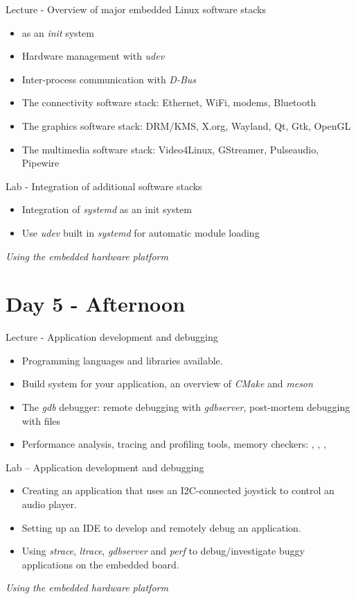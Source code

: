 \documentclass[a4paper,12pt,obeyspaces,spaces,hyphens]{article}
\begin{document}
\feagendatwocolumn
{Lecture - Overview of major embedded Linux software stacks}
{
  \begin{itemize}
  \item {} as an {\em init} system
  \item Hardware management with {\em udev}
  \item Inter-process communication with {\em D-Bus}
  \item The connectivity software stack: Ethernet, WiFi, modems,
    Bluetooth
  \item The graphics software stack: DRM/KMS, X.org, Wayland, Qt, Gtk,
    OpenGL
  \item The multimedia software stack: Video4Linux, GStreamer,
    Pulseaudio, Pipewire
  \end{itemize}
}
{Lab - Integration of additional software stacks}
{
  \begin{itemize}
  \item Integration of {\em systemd} as an init system
  \item Use {\em udev} built in {\em systemd} for automatic module
    loading
  \end{itemize}

  \vspace{0.5cm}
  {\em Using the embedded hardware platform}
}

\section{Day 5 - Afternoon}

\feagendatwocolumn
{Lecture - Application development and debugging}
{
  \begin{itemize}
  \item Programming languages and libraries available.
  \item Build system for your application, an overview of {\em CMake}
    and {\em meson}
  \item The {\em gdb} debugger: remote debugging with {\em gdbserver},
    post-mortem debugging with  files
  \item Performance analysis, tracing and profiling tools, memory
    checkers: , , ,
  \end{itemize}
}
{Lab – Application development and debugging}
{
  \begin{itemize}
  \item Creating an application that uses an I2C-connected joystick to
    control an audio player.
  \item Setting up an IDE to develop and remotely debug an
    application.
  \item Using {\em strace}, {\em ltrace}, {\em gdbserver} and {\em
      perf} to debug/investigate buggy applications on the embedded
    board.
  \end{itemize}

  \vspace{0.5cm}
  {\em Using the embedded hardware platform}
}
\end{document}
